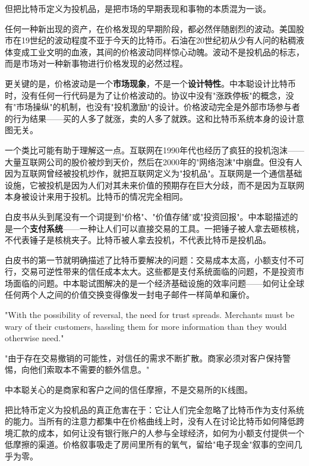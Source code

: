 \documentclass[a4paper,12pt,openany]{ctexbook}
\newenvironment{quoting}{%
  \par\vspace{0.5em}%
  \begin{list}{}{%
    \setlength{\leftmargin}{2em}%
    \setlength{\rightmargin}{2em}%
    \setlength{\parsep}{0.3em}%
    \setlength{\itemsep}{0pt}%
    \setlength{\topsep}{0pt}%
  }%
  \item\relax
}{%
  \end{list}%
  \par\vspace{0.5em}%
}
\begin{document}
但把比特币定义为投机品，是把市场的早期表现和事物的本质混为一谈。

任何一种新出现的资产，在价格发现的早期阶段，都必然伴随剧烈的波动。美国股市在19世纪的波动程度不亚于今天的比特币。石油在20世纪初从少有人问的粘稠液体变成工业文明的血液，其间的价格波动同样惊心动魄。波动不是投机品的标志，而是市场对一种新事物进行价格发现的必然过程。

更关键的是，价格波动是一个\textbf{市场现象}，不是一个\textbf{设计特性}。中本聪设计比特币时，没有任何一行代码是为了让价格波动的。协议中没有"涨跌停板"的概念，没有"市场操纵"的机制，也没有"投机激励"的设计。价格波动完全是外部市场参与者的行为结果——买的人多了就涨，卖的人多了就跌。这和比特币系统本身的设计意图无关。

一个类比可能有助于理解这一点。互联网在1990年代也经历了疯狂的投机泡沫——大量互联网公司的股价被炒到天价，然后在2000年的"网络泡沫"中崩盘。但没有人因为互联网曾经被投机炒作，就把互联网定义为"投机品"。互联网是一个通信基础设施，它被投机是因为人们对其未来价值的预期存在巨大分歧，而不是因为互联网本身被设计来用于投机。比特币的情况完全相同。

白皮书从头到尾没有一个词提到"价格"、"价值存储"或"投资回报"。中本聪描述的是一个\textbf{支付系统}——一种让人们可以直接交易的工具。一把锤子被人拿去砸核桃，不代表锤子是核桃夹子。比特币被人拿去投机，不代表比特币是投机品。

白皮书的第一节就明确描述了比特币要解决的问题：交易成本太高，小额支付不可行，交易可逆性带来的信任成本太大。这些都是支付系统面临的问题，不是投资市场面临的问题。中本聪试图解决的是一个经济基础设施的效率问题——如何让全球任何两个人之间的价值交换变得像发一封电子邮件一样简单和廉价。


\begin{quoting}
\small
"With the possibility of reversal, the need for trust spreads. Merchants must be wary of their customers, hassling them for more information than they would otherwise need."

"由于存在交易撤销的可能性，对信任的需求不断扩散。商家必须对客户保持警惕，向他们索取本不需要的额外信息。"
\end{quoting}


中本聪关心的是商家和客户之间的信任摩擦，不是交易所的K线图。

把比特币定义为投机品的真正危害在于：它让人们完全忽略了比特币作为支付系统的能力。当所有的注意力都集中在价格曲线上时，没有人在讨论比特币如何降低跨境汇款的成本，如何让没有银行账户的人参与全球经济，如何为小额支付提供一个低摩擦的渠道。价格叙事吸走了房间里所有的氧气，留给"电子现金"叙事的空间几乎为零。
\end{document}
